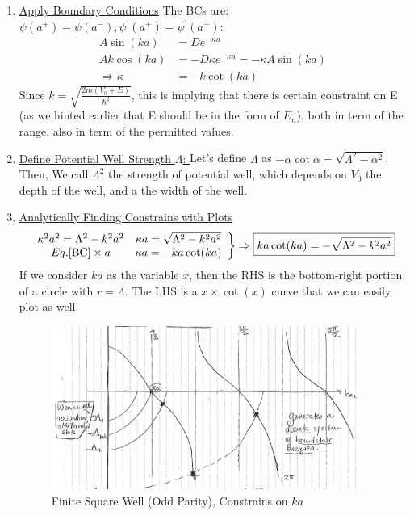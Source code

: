 \documentclass{school-22.101-notes}
\begin{document}
\begin{enumerate}
\item \uline{Apply Boundary Conditions}
The BCs are: $\psi(a^+) = \psi(a^-), \psi^{\prime}(a^+) = \psi^{\prime}(a^-)$: 
\begin{align}
A \sin (ka) &= D e^{-\kappa a } \\
A k \cos (ka) &= - D \kappa e^{-\kappa a} = - \kappa A \sin (ka) \\
\Rightarrow \kappa &= - k \cot (ka)\label{BC}
\end{align}
Since $k = \sqrt{ \frac{2 m (V_0 + E)}{\hbar^2} }$, this is implying that there is certain constraint on E (as we hinted earlier that E should be in the form of $E_n$), both in term of the range, also in term of the permitted values. 

\item \uline{Define Potential Well Strength $\Lambda$: } Let's define $\Lambda$ as $-\alpha \cot \alpha = \sqrt{\Lambda^2 - \alpha^2}$. Then,
We call $\Lambda^2$ the strength of potential well, which depends on $V_0$ the depth of the well, and a the width of the well. 

\item \uline{Analytically Finding Constrains with Plots}
\begin{align}
\left.
\begin{array}{cc} 
\kappa^2 a^2 = \Lambda^2 - k^2 a^2  & \kappa a = \sqrt{\Lambda^2 - k^2 a^2} \\
Eq.\ref{BC} \times a                & \kappa a = - ka \cot (ka)
\end{array}
\right\}  \Rightarrow \boxed{ ka \cot (ka) = - \sqrt{ \Lambda^2 - k^2 a^2 } } 
\end{align}
If we consider $ka$ as the variable $x$, then the RHS is the bottom-right portion of a circle with $r = \Lambda$. The LHS is a $x \times \cot(x)$ curve that we can easily plot as well.
\begin{figure}[h!]
    \centering
    \includegraphics[width=4in]{images/qm/FSW-odd-graph-ka.png}
    \caption{Finite Square Well (Odd Parity), Constrains on $ka$\label{FSW-odd-graph-ka}}
\end{figure}


\end{enumerate}
\end{document}
